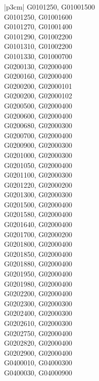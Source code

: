 \begin{customLongTable}{ |p{3cm}| }
G0101250, G01001500 \\ \hline
G0101250, G01001600 \\ \hline
G0101270, G01001400 \\ \hline
G0101290, G01002200 \\ \hline
G0101310, G01002200 \\ \hline
G0101330, G01000700 \\ \hline
G0200130, G02000400 \\ \hline
G0200160, G02000400 \\ \hline
G0200200, G02000101 \\ \hline
G0200200, G02000102 \\ \hline
G0200500, G02000400 \\ \hline
G0200600, G02000400 \\ \hline
G0200680, G02000300 \\ \hline
G0200700, G02000400 \\ \hline
G0200900, G02000300 \\ \hline
G0201000, G02000300 \\ \hline
G0201050, G02000400 \\ \hline
G0201100, G02000300 \\ \hline
G0201220, G02000200 \\ \hline
G0201300, G02000300 \\ \hline
G0201500, G02000400 \\ \hline
G0201580, G02000400 \\ \hline
G0201640, G02000400 \\ \hline
G0201700, G02000200 \\ \hline
G0201800, G02000400 \\ \hline
G0201850, G02000400 \\ \hline
G0201880, G02000400 \\ \hline
G0201950, G02000400 \\ \hline
G0201980, G02000400 \\ \hline
G0202200, G02000400 \\ \hline
G0202300, G02000300 \\ \hline
G0202400, G02000300 \\ \hline
G0202610, G02000300 \\ \hline
G0202750, G02000400 \\ \hline
G0202820, G02000400 \\ \hline
G0202900, G02000400 \\ \hline
G0400010, G04000300 \\ \hline
G0400030, G04000900 \\ \hline

\end{customLongTable}
